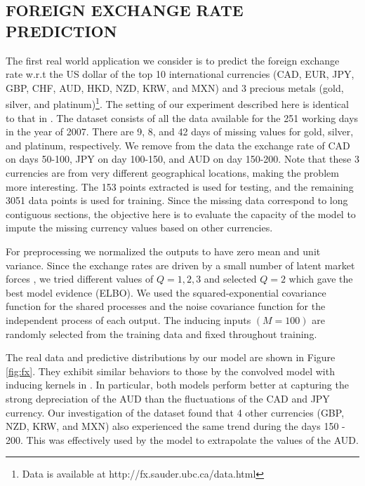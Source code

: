 \subsection{FOREIGN EXCHANGE RATE PREDICTION}
The first real world application we consider is to predict the foreign exchange rate w.r.t the US dollar of the top 10 international currencies (CAD, EUR, JPY, GBP, CHF, AUD, HKD, NZD, KRW, and MXN) and 3 precious metals (gold, silver, and platinum)\footnote{Data is available at http://fx.sauder.ubc.ca/data.html}. 
The setting of our experiment described here is identical to that in \citet{alvarez2010efficient}.
The dataset consists of all the data available for the 251 working days in the year of 2007.
There are 9, 8, and 42 days of missing values  for gold, silver, and platinum, respectively.
We remove from the data the exchange rate of CAD on days 50-100, JPY on day 100-150, and AUD on day 150-200.
Note that these 3 currencies are from very different geographical locations, making the problem more interesting. 
The 153 points extracted is used for testing, and the remaining 3051 data points is used for training.
Since the missing data correspond to long contiguous sections, the objective here is to evaluate the capacity of the model to impute the missing currency values based on other currencies.

For preprocessing we normalized the outputs to have zero mean and unit variance.
Since the exchange rates are driven by a small number of latent market forces \citet{alvarez2010efficient}, we tried different values of $Q = {1,2,3}$ and selected $Q = 2$ which gave the best model evidence (ELBO).
We used the squared-exponential covariance function for the shared processes and the noise covariance function for the independent process of each output.
The inducing inputs $(M = 100)$ are randomly selected from the training data and fixed throughout training.

The real data and predictive distributions by our model are shown in Figure \ref{fig:fx}.
They exhibit similar behaviors to those by the convolved model with inducing kernels in \citet{alvarez2010efficient}.
In particular, both models perform better at capturing the strong depreciation of the AUD than the fluctuations of the CAD and JPY currency.
Our investigation of the dataset found that 4 other currencies (GBP, NZD, KRW, and MXN) also experienced the same trend during the days 150 - 200.
This was effectively used by the model to extrapolate the values of the AUD.

